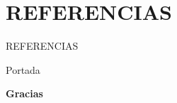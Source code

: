 \nocite{*} %
\section*{REFERENCIAS}
\begin{frame}{REFERENCIAS} %
\begingroup %
\renewcommand{\color}[1]{} %
\small{} %

\endgroup %
\end{frame}
\begin{frame} %
	\begin{beamercolorbox}[ht=\paperheight,wd=\paperwidth, center]{Portada}
		\begin{center}\Huge\textbf{Gracias}\end{center} %
		
		\vspace{0.44\paperheight}
    \end{beamercolorbox}
\end{frame}
